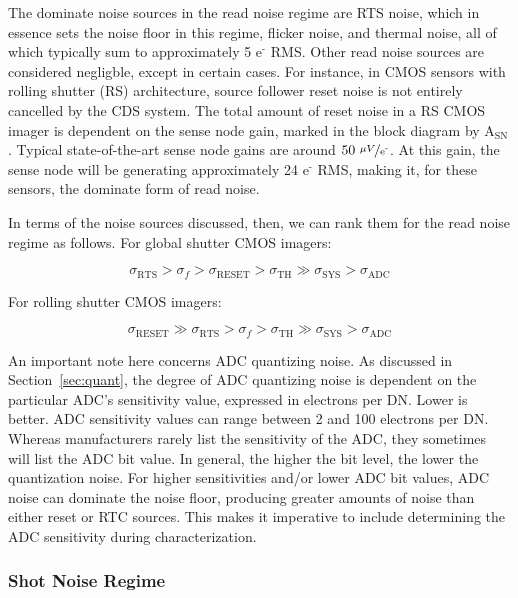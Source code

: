 \documentclass[10pt]{article}
\begin{document}
The dominate noise sources in the read noise regime are RTS noise, which in essence sets the noise floor in this regime, flicker noise, and thermal noise, all of which typically sum to approximately 5 $\text{e}^{\text{-}}$ RMS. Other read noise sources are considered negligble, except in certain cases. For instance, in CMOS sensors with rolling shutter (RS) architecture, source follower reset noise is not entirely cancelled by the CDS system. The total amount of reset noise in a RS CMOS imager is dependent on the sense node gain, marked in the block diagram by $\text{A}_{\text{SN}}$. Typical state-of-the-art sense node gains are around $\text{50 } \nicefrac{\mu V}{\text{e}^{\text{-}}} $. At this gain, the sense node will be generating approximately 24 $\text{e}^{\text{-}}$ RMS, making it, for these sensors, the dominate form of read noise.

In terms of the noise sources discussed, then, we can rank them for the read noise regime as follows. For global shutter CMOS imagers:

$$ \sigma_{\text{RTS}} > \sigma_f > \sigma_{\text{RESET}} > \sigma_{\text{TH}} \gg \sigma_{\text{SYS}} > \sigma_{\text{ADC}}$$

\vspace{2mm}

For rolling shutter CMOS imagers:

$$ \sigma_{\text{RESET}} \gg \sigma_{\text{RTS}} > \sigma_f > \sigma_{\text{TH}} \gg \sigma_{\text{SYS}} > \sigma_{\text{ADC}}$$

\vspace{2mm}

An important note here concerns ADC quantizing noise. As discussed in Section~\ref{sec:quant}, the degree of ADC quantizing noise is dependent on the particular ADC's sensitivity value, expressed in electrons per DN. Lower is better. ADC sensitivity values can range between 2 and 100 electrons per DN. Whereas manufacturers rarely list the sensitivity of the ADC, they sometimes will list the ADC bit value. In general, the higher the bit level, the lower the quantization noise. For higher sensitivities and/or lower ADC bit values, ADC noise can dominate the noise floor, producing greater amounts of noise than either reset or RTC sources. This makes it imperative to include determining the ADC sensitivity during characterization.

\subsubsection{Shot Noise Regime}
\end{document}

